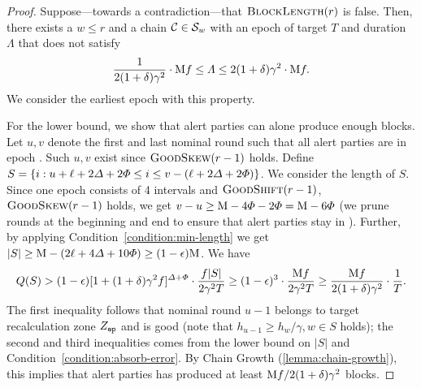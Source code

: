 \begin{proof}
    Suppose---towards a contradiction---that $\textsc{BlockLength}(r)$ is false.
    Then, there exists a $w \le r$ and a chain $\mathcal{C} \in \mathcal{S}_w$ with an epoch of target $T$ and duration $\varLambda$ that does not satisfy
    \[ \frac{1}{2(1 + \delta)\gamma^2} \cdot \mathrm{M} f \le \varLambda \le 2(1 + \delta)\gamma^2 \cdot \mathrm{M} f. \]
    We consider the earliest epoch \epoch with this property.

    For the lower bound, we show that alert parties can alone produce enough blocks.
    Let $u, v$ denote the first and last nominal round such that all alert parties are in epoch \epoch.
    Such $u, v$ exist since $\textsc{GoodSkew}(r - 1)$ holds.
    Define $S = \{i: u + \ell + 2\varDelta + 2\varPhi \le i \le v - (\ell + 2\varDelta + 2\varPhi) \}$.
    We consider the length of $S$.
    Since one epoch consists of 4 intervals and $\textsc{GoodShift}(r - 1)$, $\textsc{GoodSkew}(r - 1)$ holds, we get $v - u \ge \mathrm{M} - 4\varPhi - 2\varPhi = \mathrm{M} - 6\varPhi$ (we prune \maxskew rounds at the beginning and end to ensure that alert parties stay in \epoch).
    Further, by applying Condition~\eqref{condition:min-length} we get $|S| \ge \mathrm{M} - (2\ell + 4\varDelta + 10\varPhi) \ge (1 - \epsilon) \mathrm{M}$.
    We have
    \[ Q(S) > (1 - \epsilon) [1 + (1 + \delta)\gamma^2 f]^{\varDelta + \varPhi} \cdot \frac{f |S|}{2\gamma^2 T} \ge (1 - \epsilon)^3 \cdot \frac{\mathrm{M} f}{2\gamma^2 T} \ge \frac{\mathrm{M} f}{2(1 + \delta) \gamma^2 } \cdot \frac{1}{T}. \]
    The first inequality follows that nominal round $u - 1$ belongs to target recalculation zone $Z_\mathtt{ep}$ and is good (note that $h_{u - 1} \ge h_w / \gamma, w \in S$ holds); the second and third inequalities comes from the lower bound on $|S|$ and Condition~\eqref{condition:absorb-error}.
    By Chain Growth (\cref{lemma:chain-growth}), this implies that alert parties has produced at least $\mathrm{M} f / 2(1 + \delta) \gamma^2$ blocks.


\end{proof}
